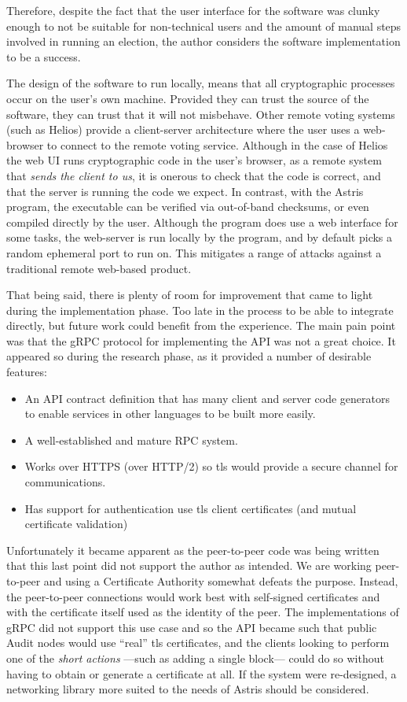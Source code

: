 Therefore, despite the fact that the user interface for the software was clunky enough to not be suitable for non-technical users and the amount of manual steps involved in running an election, the author considers the software implementation to be a success.

The design of the software to run locally, means that all cryptographic processes occur on the user's own machine. Provided they can trust the source of the software, they can trust that it will not misbehave. Other remote voting systems (such as Helios) provide a client-server architecture where the user uses a web-browser to connect to the remote voting service. Although in the case of Helios the web UI runs cryptographic code in the user's browser, as a remote system that \emph{sends the client to us}, it is onerous to check that the code is correct, and that the server is running the code we expect. In contrast, with the Astris program, the executable can be verified via out-of-band checksums, or even compiled directly by the user. Although the program does use a web interface for some tasks, the web-server is run locally by the program, and by default picks a random ephemeral port to run on. This mitigates a range of attacks against a traditional remote web-based product.

That being said, there is plenty of room for improvement that came to light during the implementation phase. Too late in the process to be able to integrate directly, but future work could benefit from the experience. The main pain point was that the gRPC protocol for implementing the API was not a great choice. It appeared so during the research phase, as it provided a number of desirable features:

\begin{itemize}
    \item An API contract definition that has many client and server code generators to enable services in other languages to be built more easily.
    \item A well-established and mature RPC system.
    \item Works over HTTPS (over HTTP/2) so \gls{tls} would provide a secure channel for communications.
    \item Has support for authentication use \gls{tls} client certificates (and mutual certificate validation)
\end{itemize}

Unfortunately it became apparent as the peer-to-peer code was being written that this last point did not support the author as intended. We are working peer-to-peer and using a Certificate Authority somewhat defeats the purpose. Instead, the peer-to-peer connections would work best with self-signed certificates and with the certificate itself used as the identity of the peer. The implementations of gRPC did not support this use case and so the API became such that public Audit nodes would use ``real'' \gls{tls} certificates, and the clients looking to perform one of the \emph{short actions} ---such as adding a single block--- could do so without having to obtain or generate a certificate at all. If the system were re-designed, a networking library more suited to the needs of Astris should be considered.

